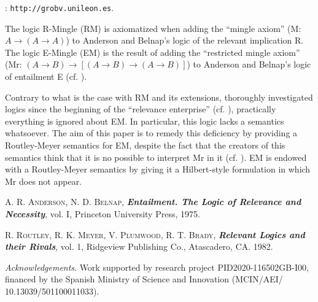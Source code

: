 \documentclass[bsl,meeting]{asl}
\def\urladdr#1{\endgraf\noindent{\it URL Address}: {\tt #1}.}
\newcommand{\NP}{}
\begin{document}
\thispagestyle{empty}


\NP  
{}
\urladdr{http://grobv.unileon.es}

The logic R-Mingle (RM) is axiomatized when adding the ``mingle axiom'' (M: $A\rightarrow (A\rightarrow A)$) to Anderson and Belnap's logic of the relevant implication R. The logic E-Mingle (EM) is the result of  adding the ``restricted mingle axiom'' (Mr: $(A\rightarrow B)\rightarrow [(A\rightarrow B)\rightarrow (A\rightarrow B)]$) to Anderson and Belnap's logic of entailment E (cf. \cite{ABI}).

Contrary to what is the case with RM and its extensions, thoroughly investigated logics since the beginning of the ``relevance enterprise'' (cf. \cite{ABI}), practically everything is ignored about EM. In particular, this logic lacks a semantics whatsoever. The aim of this paper is to remedy this deficiency by providing a Routley-Meyer semantics for EM, despite the fact that the creators of this semantics think that it is no possible to interpret Mr in it (cf. \cite[\S 4.9]{RMPB}). EM is endowed with a Routley-Meyer semantics by giving it a Hilbert-style formulation in which Mr does not appear.


\begin{thebibliography}{10}

{\scshape A. R. Anderson, N. D. Belnap},
{\bfseries\itshape Entailment. The Logic of Relevance and Necessity}, 
vol. I, 
Princeton University Press,
1975.

{\scshape R. Routley, R. K. Meyer, V. Plumwood, R. T. Brady},
{\bfseries\itshape Relevant Logics and their Rivals},
vol. 1,
Ridgeview Publishing Co., Atascadero, CA.
1982.

\end{thebibliography}


\vspace*{-0.5\baselineskip}

\medskip
{\itshape Acknowledgements}. Work supported by research project PID2020-116502GB-I00, financed by the Spanish Ministry of Science and Innovation (MCIN/AEI/ \\ 10.13039/501100011033).
\end{document}
